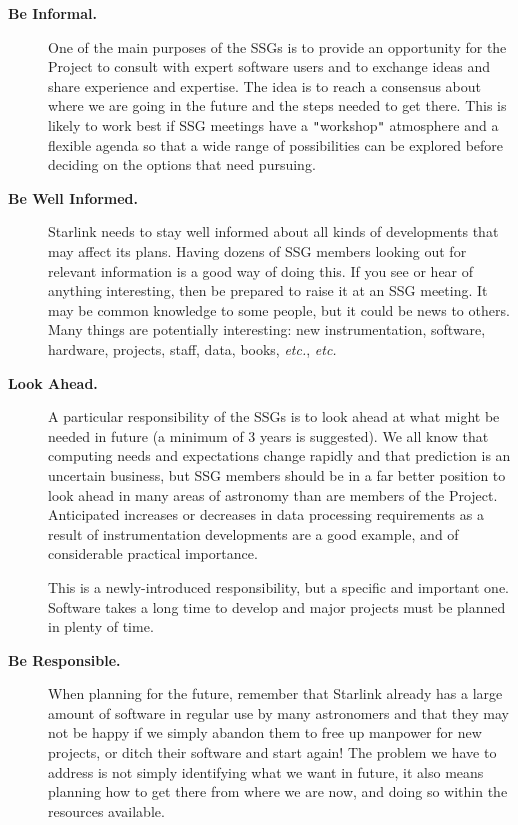 \documentclass[11pt]{article}
\newcommand{\st}[1]{{\em{#1}}}
\newcommand{\qt}[1]{``#1''}
\renewcommand{\qt}[1]{{\tt{"}}#1{\tt{"}}}
\begin{document}
\begin{description}

\item [{\bf Be Informal.}] One of the main purposes of the SSGs is to
provide an opportunity for the Project to consult with expert software
users and to exchange ideas and share experience and expertise. The
idea is to reach a consensus about where we are going in the future
and the steps needed to get there. This is likely to work best if SSG
meetings have a \qt{workshop} atmosphere and a flexible agenda so that
a wide range of possibilities can be explored before deciding on the
options that need pursuing.

\item[{\bf Be Well Informed.}] Starlink needs to stay well informed
about all kinds of developments that may affect its plans. Having
dozens of SSG members looking out for relevant information is a good
way of doing this. If you see or hear of anything interesting, then be
prepared to raise it at an SSG meeting. It may be common knowledge
to some people, but it could be news to others. Many things are
potentially interesting: new instrumentation, software, hardware,
projects, staff, data, books, \st{etc.}, \st{etc.}

\item[{\bf Look Ahead.}] A particular responsibility of the SSGs is to
look ahead at what might be needed in future (a minimum of 3 years is
suggested). We all know that computing needs and expectations change
rapidly and that prediction is an uncertain business, but SSG members
should be in a far better position to look ahead in many areas of
astronomy than are members of the Project.  Anticipated increases or
decreases in data processing requirements as a result of
instrumentation developments are a good example, and of considerable
practical importance.

This is a newly-introduced responsibility, but a specific and
important one. Software takes a long time to develop and major
projects must be planned in plenty of time.

\item[{\bf Be Responsible.}] When planning for the future, remember
that Starlink already has a large amount of software in regular use by
many astronomers and that they may not be happy if we simply abandon
them to free up manpower for new projects, or ditch their software and
start again! The problem we have to address is not simply identifying
what we want in future, it also means planning how to get there from
where we are now, and doing so within the resources available.


\end{description}
\end{document}
